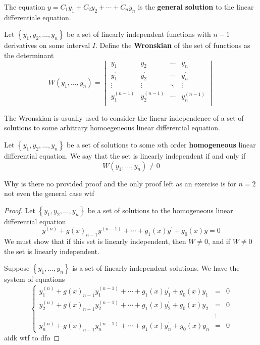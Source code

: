 \begin{remark}
    The equation \( y = C_1 y_1 + C_2 y_2 + \cdots + C_n y_n\) is the \textbf{general} \textbf{solution} to the linear differentiale equation.
\end{remark}
\begin{definition}[Wronskian]
    Let \(\left\{ y_1,y_2,\ldots,y_n \right\}\) be a set of linearly independent functions with \(n-1\) derivatives on some interval \(I\). Define the \textbf{Wronskian} of the set of functions as the determinant 
    \[
        W(y_{1},\ldots,y_n )=\begin{vmatrix}
            y_1 &y_2  &\cdots  &y_n   \\
             y_1^{\prime} &y_2^{\prime}   &\cdots  &y_n^{\prime}    \\
             \vdots&\vdots  &\ddots  &\vdots   \\
             y_1^{(n-1)}& y_2^{(n-1)} &\cdots  &y_n^{(n-1)}   \\
        \end{vmatrix}
    \]
\end{definition}
The Wronskian is usually used to consider the linear independence of a set of solutions to some arbitrary homoegeneous linear differential equation. 
\begin{theorem}
    Let \(\left\{y_1,y_2,\ldots,y_n\right\}\) be a set of solutions to some \(n\)th order \textbf{homogeneous} linear differential equation. We say that the set is linearly independent if and only if 
    \[
        W\left( y_1,\ldots,y_n \right)\neq 0 
    \]
\end{theorem}
Why is there no provided proof and the only proof left as an exercise is for \(n=2\) not even the general case wtf 
\begin{proof}
    Let \(\left\{ y_1,y_2,\ldots,y_n \right\} \) be a set of solutions to the homogeneous linear differential equation
    \[
        y^{(n)} + g(x)_{n-1}y^{(n-1)}+\cdots+g_1(x)y^{\prime} +g_0(x)y = 0
    \]
    We must show that if this set is linearly independent, then \(W\neq 0\), and if \(W\neq 0\) the set is linearly independent.

    Suppose \(\left\{ y_1,\ldots,y_n \right\} \) is a set of linearly independent solutions. We have the system of equations 
    \[
        \left\{
            \begin{array}{ccc}
                y^{(n)}_1 + g(x)_{n-1}y^{(n-1)}_1+\cdots+g_1(x)y^{\prime}_1 +g_0(x)y_1 &=& 0\\
                y^{(n)}_2 + g(x)_{n-1}y^{(n-1)}_2+\cdots+g_1(x)y^{\prime}_2 +g_0(x)y_2 &=& 0\\
                &\vdots&\\
                y^{(n)}_n + g(x)_{n-1}y^{(n-1)}_n +\cdots+g_1(x)y^{\prime}_n +g_0(x)y_n &=& 0
            \end{array}
        \right.
    \]
    aidk wtf to dfo
\end{proof}